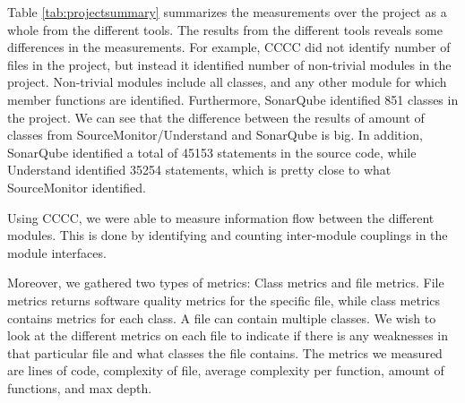 Table \ref{tab:projectsummary} summarizes the measurements over the project as a whole from the different tools. The results from the different tools reveals some differences in the measurements. For example, CCCC did not identify number of files in the project, but instead it identified number of non-trivial modules in the project. Non-trivial modules include all classes, and any other module for which member functions are identified. Furthermore, SonarQube identified 851 classes in the project. We can see that the difference between the results of amount of classes from SourceMonitor/Understand and SonarQube is big. In addition, SonarQube identified a total of 45153 statements in the source code, while Understand identified 35254 statements, which is pretty close to what SourceMonitor identified. 

Using CCCC, we were able to measure information flow between the different modules. This is done by identifying and counting inter-module couplings in the module interfaces. 






Moreover, we gathered two types of metrics: Class metrics and file metrics. File metrics returns software quality metrics for the specific file, while class metrics contains metrics for each class. A file can contain multiple classes. We wish to look at the different metrics on each file to indicate if there is any weaknesses in that particular file and what classes the file contains. The metrics we measured are lines of code, complexity of file, average complexity per function, amount of functions, and max depth. 

